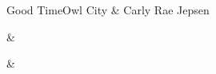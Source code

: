 \documentclass[a4paper,11pt,french]{article}
\begin{document}
\begin{Song}{Good Time}{Owl City \& Carly Rae Jepsen}
\vfill

\begin{multicols}{2}
\gridGroupNormal

\begin{Chords}
\hline
{} & \\\hline
\end{Chords}
\vfill
\columnbreak


\begin{Chords}
\hline
{} & \\\hline
\end{Chords}
\vfill
~
\end{multicols}

\vfill

\end{Song}

\end{document}
